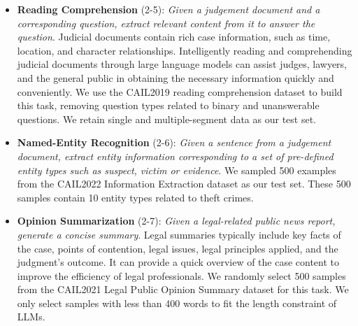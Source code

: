 \begin{itemize}
    \item \textbf{Reading Comprehension} (2-5): \emph{Given a judgement document and a corresponding question, extract relevant content from it to answer the question}. Judicial documents contain rich case information, such as time, location, and character relationships. Intelligently reading and comprehending judicial documents through large language models can assist judges, lawyers, and the general public in obtaining the necessary information quickly and conveniently. We use the CAIL2019 reading comprehension dataset to build this task, removing question types related to binary and unanswerable questions. We retain single and multiple-segment data as our test set.

    \item \textbf{Named-Entity Recognition} (2-6): \emph{Given a sentence from a judgement document, extract entity information corresponding to a set of pre-defined entity types such as suspect, victim or evidence}. We sampled 500 examples from the CAIL2022 Information Extraction dataset as our test set. These 500 samples contain 10 entity types related to theft crimes.

    \item \textbf{Opinion Summarization} (2-7): \emph{Given a legal-related public news report, generate a concise summary}. Legal summaries typically include key facts of the case, points of contention, legal issues, legal principles applied, and the judgment's outcome. It can provide a quick overview of the case content to improve the efficiency of legal professionals. 
We randomly select 500 samples from the CAIL2021 Legal Public Opinion Summary dataset for this task. We only select samples with less than 400 words to fit the length constraint of LLMs.


\end{itemize}
